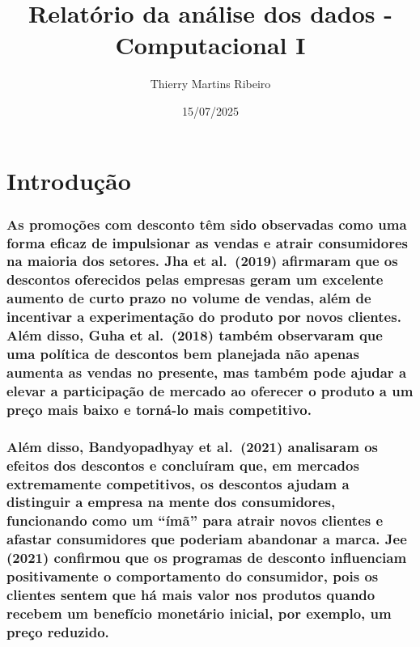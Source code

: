 \documentclass[
]{article}
\title{Relatório da análise dos dados - Computacional I}
\author{Thierry Martins Ribeiro}
\date{15/07/2025}
\begin{document}
\maketitle

\section{Introdução}\label{introduuxe7uxe3o}

\subsubsection{As promoções com desconto têm sido observadas como uma
forma eficaz de impulsionar as vendas e atrair consumidores na maioria
dos setores. Jha et al.~(2019) afirmaram que os descontos oferecidos
pelas empresas geram um excelente aumento de curto prazo no volume de
vendas, além de incentivar a experimentação do produto por novos
clientes. Além disso, Guha et al.~(2018) também observaram que uma
política de descontos bem planejada não apenas aumenta as vendas no
presente, mas também pode ajudar a elevar a participação de mercado ao
oferecer o produto a um preço mais baixo e torná-lo mais
competitivo.}\label{as-promouxe7uxf5es-com-desconto-tuxeam-sido-observadas-como-uma-forma-eficaz-de-impulsionar-as-vendas-e-atrair-consumidores-na-maioria-dos-setores.-jha-et-al.-2019-afirmaram-que-os-descontos-oferecidos-pelas-empresas-geram-um-excelente-aumento-de-curto-prazo-no-volume-de-vendas-aluxe9m-de-incentivar-a-experimentauxe7uxe3o-do-produto-por-novos-clientes.-aluxe9m-disso-guha-et-al.-2018-tambuxe9m-observaram-que-uma-poluxedtica-de-descontos-bem-planejada-nuxe3o-apenas-aumenta-as-vendas-no-presente-mas-tambuxe9m-pode-ajudar-a-elevar-a-participauxe7uxe3o-de-mercado-ao-oferecer-o-produto-a-um-preuxe7o-mais-baixo-e-tornuxe1-lo-mais-competitivo.}

\subsubsection{Além disso, Bandyopadhyay et al.~(2021) analisaram os
efeitos dos descontos e concluíram que, em mercados extremamente
competitivos, os descontos ajudam a distinguir a empresa na mente dos
consumidores, funcionando como um ``ímã'' para atrair novos clientes e
afastar consumidores que poderiam abandonar a marca. Jee (2021)
confirmou que os programas de desconto influenciam positivamente o
comportamento do consumidor, pois os clientes sentem que há mais valor
nos produtos quando recebem um benefício monetário inicial, por exemplo,
um preço
reduzido.}\label{aluxe9m-disso-bandyopadhyay-et-al.-2021-analisaram-os-efeitos-dos-descontos-e-concluuxedram-que-em-mercados-extremamente-competitivos-os-descontos-ajudam-a-distinguir-a-empresa-na-mente-dos-consumidores-funcionando-como-um-uxedmuxe3-para-atrair-novos-clientes-e-afastar-consumidores-que-poderiam-abandonar-a-marca.-jee-2021-confirmou-que-os-programas-de-desconto-influenciam-positivamente-o-comportamento-do-consumidor-pois-os-clientes-sentem-que-huxe1-mais-valor-nos-produtos-quando-recebem-um-benefuxedcio-monetuxe1rio-inicial-por-exemplo-um-preuxe7o-reduzido.}
\end{document}
